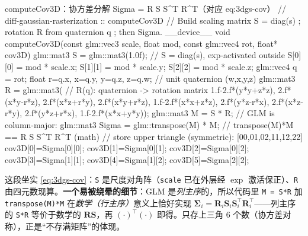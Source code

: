 \begin{codebox}[C++]{computeCov3D：协方差分解 Sigma = R S S\textasciicircum T R\textasciicircum T（对应 eq:3dgs-cov）}
// diff-gaussian-rasterization :: computeCov3D
// Build scaling matrix S = diag(s) ; rotation R from quaternion q ; then Sigma.
__device__ void computeCov3D(const glm::vec3 scale, float mod,
                             const glm::vec4 rot, float* cov3D) {
    glm::mat3 S = glm::mat3(1.0f);                 // S = diag(s), exp-activated outside
    S[0][0] = mod * scale.x;  S[1][1] = mod * scale.y;  S[2][2] = mod * scale.z;
    glm::vec4 q = rot;  float r=q.x, x=q.y, y=q.z, z=q.w;   // unit quaternion (w,x,y,z)
    glm::mat3 R = glm::mat3(                        // R(q): quaternion -> rotation matrix
        1.f-2.f*(y*y+z*z), 2.f*(x*y-r*z),     2.f*(x*z+r*y),
        2.f*(x*y+r*z),     1.f-2.f*(x*x+z*z), 2.f*(y*z-r*x),
        2.f*(x*z-r*y),     2.f*(y*z+r*x),     1.f-2.f*(x*x+y*y));
    glm::mat3 M = S * R;                            // GLM is column-major:
    glm::mat3 Sigma = glm::transpose(M) * M;        //  transpose(M)*M  ==  R S S^T R^T (math)
    // store upper triangle (symmetric): [00,01,02,11,12,22]
    cov3D[0]=Sigma[0][0]; cov3D[1]=Sigma[0][1]; cov3D[2]=Sigma[0][2];
    cov3D[3]=Sigma[1][1]; cov3D[4]=Sigma[1][2]; cov3D[5]=Sigma[2][2];
}
\end{codebox}

\noindent{}这段坐实 \cref{eq:3dgs-cov}：\texttt{S} 是尺度对角阵（\texttt{scale} 已在外层经 $\exp$ 激活保正）、\texttt{R} 由四元数现算。\textbf{一个易被绕晕的细节}：GLM 是\emph{列主序}的，所以代码里 \texttt{M = S*R} 加 \texttt{transpose(M)*M} 在\emph{数学（行主序）}意义上恰好实现 $\boldsymbol\Sigma_i=\mathbf R_i\mathbf S_i\mathbf S_i^\top\mathbf R_i^\top$——列主序的 \texttt{S*R} 等价于数学的 $\mathbf R\mathbf S$，再 $(\cdot)^\top(\cdot)$ 即得。只存上三角 $6$ 个数（协方差对称），正是“不存满矩阵”的体现。

